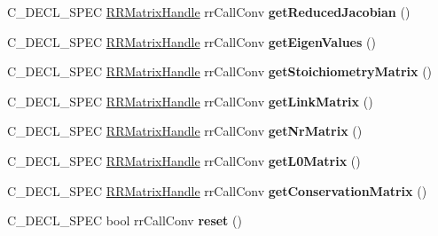 \begin{DoxyCompactItemize}
\item 
\hypertarget{group__loadsave_ga503c810c1be94e486441eeea88163a18}{
\-C\-\_\-\-D\-E\-C\-L\-\_\-\-S\-P\-E\-C \hyperlink{struct_r_r_matrix}{\-R\-R\-Matrix\-Handle} \*
rr\-Call\-Conv {\bfseries get\-Reduced\-Jacobian} ()}
\label{group__loadsave_ga503c810c1be94e486441eeea88163a18}

\item 
\hypertarget{group__loadsave_ga7c7c6eb0e77711983254488895f24b81}{
\-C\-\_\-\-D\-E\-C\-L\-\_\-\-S\-P\-E\-C \hyperlink{struct_r_r_matrix}{\-R\-R\-Matrix\-Handle} \*
rr\-Call\-Conv {\bfseries get\-Eigen\-Values} ()}
\label{group__loadsave_ga7c7c6eb0e77711983254488895f24b81}

\item 
\hypertarget{group__loadsave_gad361175745409d5b6670b8a8996a6d59}{
\-C\-\_\-\-D\-E\-C\-L\-\_\-\-S\-P\-E\-C \hyperlink{struct_r_r_matrix}{\-R\-R\-Matrix\-Handle} \*
rr\-Call\-Conv {\bfseries get\-Stoichiometry\-Matrix} ()}
\label{group__loadsave_gad361175745409d5b6670b8a8996a6d59}

\item 
\hypertarget{group__loadsave_gae8e8c6ede9f60e33dcdc190c061ce3f8}{
\-C\-\_\-\-D\-E\-C\-L\-\_\-\-S\-P\-E\-C \hyperlink{struct_r_r_matrix}{\-R\-R\-Matrix\-Handle} \*
rr\-Call\-Conv {\bfseries get\-Link\-Matrix} ()}
\label{group__loadsave_gae8e8c6ede9f60e33dcdc190c061ce3f8}

\item 
\hypertarget{group__loadsave_ga57b4c651ecffb52d28886ce9e3b6e6ed}{
\-C\-\_\-\-D\-E\-C\-L\-\_\-\-S\-P\-E\-C \hyperlink{struct_r_r_matrix}{\-R\-R\-Matrix\-Handle} \*
rr\-Call\-Conv {\bfseries get\-Nr\-Matrix} ()}
\label{group__loadsave_ga57b4c651ecffb52d28886ce9e3b6e6ed}

\item 
\hypertarget{group__loadsave_ga587ae0ec7e6e7f8b2576bacf700eedcd}{
\-C\-\_\-\-D\-E\-C\-L\-\_\-\-S\-P\-E\-C \hyperlink{struct_r_r_matrix}{\-R\-R\-Matrix\-Handle} \*
rr\-Call\-Conv {\bfseries get\-L0\-Matrix} ()}
\label{group__loadsave_ga587ae0ec7e6e7f8b2576bacf700eedcd}

\item 
\hypertarget{group__loadsave_gafd1bcae76af0d5d6ccf7af7bd098de23}{
\-C\-\_\-\-D\-E\-C\-L\-\_\-\-S\-P\-E\-C \hyperlink{struct_r_r_matrix}{\-R\-R\-Matrix\-Handle} \*
rr\-Call\-Conv {\bfseries get\-Conservation\-Matrix} ()}
\label{group__loadsave_gafd1bcae76af0d5d6ccf7af7bd098de23}

\item 
\hypertarget{group__loadsave_ga07dfaf16ab38015aab6b400665ace2b2}{
\-C\-\_\-\-D\-E\-C\-L\-\_\-\-S\-P\-E\-C bool rr\-Call\-Conv {\bfseries reset} ()}
\label{group__loadsave_ga07dfaf16ab38015aab6b400665ace2b2}


\end{DoxyCompactItemize}
